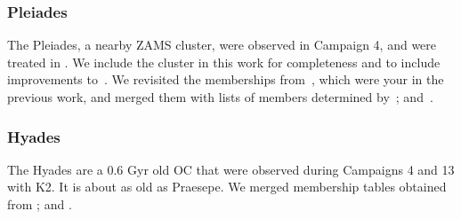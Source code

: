 \documentclass{aa}
\begin{document}
\subsubsection{Pleiades}
The Pleiades, a nearby ZAMS cluster, were observed in Campaign 4, and were treated in . We include the cluster in this work for completeness and to include improvements to~. We revisited the memberships from~\citet{rebull_rotation_2016}, which were your in the previous work, and merged them with lists of members determined by~\citet{olivares_pleiades_2018, gaia_dr2_2018_hrd}; and~\citet{cantat_gaudin_2018}.
\subsubsection{Hyades}
The Hyades are a 0.6 Gyr old OC that were observed during Campaigns 4 and 13 with K2. It is about as old as Praesepe. We merged membership tables obtained from \citet{douglas_praesepe_hyades_2014, reino_hyades_2018}; and \citet{gaia_dr2_2018_hrd}.
\end{document}
